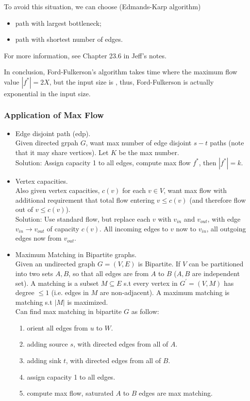 To avoid this situation, we can choose (Edmands-Karp algorithm)
\begin{itemize}
    \item path with largest bottleneck;
    \item path with shortest number of edges.
\end{itemize}
For more information, see Chapter 23.6 in Jeff's notes.

In conclusion, Ford-Fulkerson's algorithm takes  time where
the maximum flow value $|f^*| = 2X$, but the input size is ,
thus, Ford-Fulkerson is actually exponential in the input size.

\subsubsection{Application of Max Flow}
\begin{itemize}
    \item Edge disjoint path (edp).\\
        Given directed grpah $G$, want max number of edge disjoint
        $s-t$ paths (note that it may share vertices).
        Let $K$ be the max number.\\
        Solution: Assign capacity 1 to all edges, compute max flow $f^*$,
        then $|f^*| = k$.
    \item Vertex capacities.\\
        Also given vertex capacities, $c(v)$ for each $v \in V$,
        want max flow with additional requirement that total flow
        entering $v \leq c(v)$ (and therefore flow out of $v \leq c(v)$).\\
        Solution: Use standard flow, but replace each $v$ with $v_{in}$ and $v_{out}$,
        with edge $v_{in} \rightarrow v_{out}$ of capacity $c(v)$.
        All incoming edges to $v$ now to $v_{in}$, all outgoing edges now from $v_{out}$.
    \item Maximum Matching in Bipartite graphs.\\
        Given an undirected graph $G=(V,E)$ is Bipartite. If $V$ can be partitioned
        into two sets $A,B$, so that all edges are from $A$ to $B$ ($A,B$ are independent set).
        A matching is a subset $M \subseteq E$ s.t every vertex in $G^\prime = (V,M)$
        has degree $\leq 1$ (i.e. edges in $M$ are non-adjacent).
        A maximum matching is matching s.t $|M|$ is maximized.\\
        Can find max matching in bipartite $G$ as follow:
        \begin{enumerate}
            \item orient all edges from $u$ to $W$.
            \item adding source $s$, with directed edges from all of $A$.
            \item adding sink $t$, with directed edges from all of $B$.
            \item assign capacity 1 to all edges.
            \item compute max flow, saturated $A$ to $B$ edges are max matching.
        \end{enumerate}
\end{itemize}
